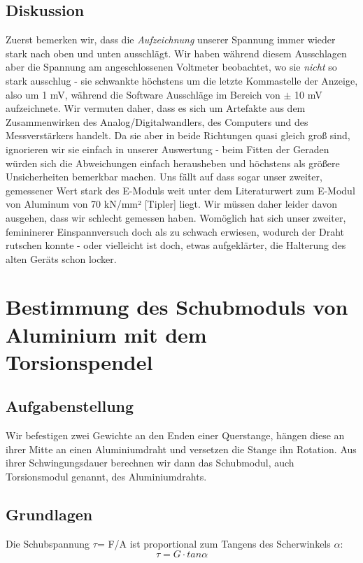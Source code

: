 \documentclass{article}
\begin{document}
\subsection{Diskussion}
Zuerst bemerken wir, dass die \textit{Aufzeichnung} unserer Spannung immer wieder stark nach oben und unten ausschlägt. Wir haben während diesem Ausschlagen aber die Spannung am angeschlossenen Voltmeter beobachtet, wo sie \textit{nicht} so stark ausschlug - sie schwankte höchstens um die letzte Kommastelle der Anzeige, also um 1 mV, während die Software Ausschläge im Bereich von $\pm$ 10 mV aufzeichnete. Wir vermuten daher, dass es sich um Artefakte aus dem Zusammenwirken des Analog/Digitalwandlers, des Computers und des Messverstärkers handelt. Da sie aber in beide Richtungen quasi gleich groß sind, ignorieren wir sie einfach in unserer Auswertung - beim Fitten der Geraden würden sich die Abweichungen einfach herausheben und höchstens als größere Unsicherheiten bemerkbar machen. 
Uns fällt auf dass sogar unser zweiter, gemessener Wert stark des E-Moduls weit unter dem
Literaturwert zum E-Modul von Aluminum von 70 kN/mm² [Tipler] liegt. Wir müssen daher leider davon ausgehen, dass wir schlecht gemessen haben. Womöglich hat sich unser zweiter, femininerer Einspannversuch doch als zu schwach erwiesen, wodurch der Draht rutschen konnte - oder vielleicht ist doch, etwas aufgeklärter, die Halterung des alten Geräts schon locker.

\section{Bestimmung des Schubmoduls von Aluminium mit dem Torsionspendel}
\subsection{Aufgabenstellung}
Wir befestigen zwei Gewichte an den Enden einer Querstange, hängen diese an ihrer Mitte an einen Aluminiumdraht und versetzen die Stange ihn Rotation. Aus ihrer Schwingungsdauer berechnen wir dann das Schubmodul, auch Torsionsmodul genannt, des Aluminiumdrahts.
\subsection{Grundlagen}
Die Schubspannung $\tau$= F/A ist proportional zum Tangens des Scherwinkels $\alpha$:
$$ \tau = G\cdot	tan\alpha$$
\end{document}

